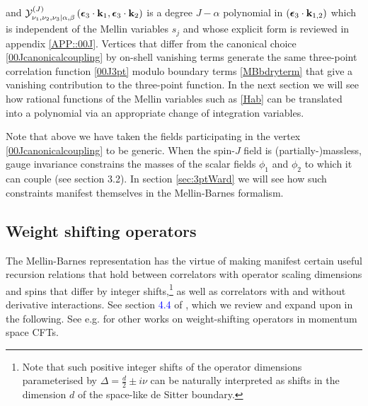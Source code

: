 \documentclass[11pt,a4paper]{article}
\newcommand{\tcb}{\textcolor{blue}}
\begin{document}
and ${\cal Y}^{\left(J\right)}_{\nu_1,\nu_2,\nu_3|\alpha,\beta}\left(\boldsymbol{\epsilon}_3 \cdot {\bf k}_1,\boldsymbol{\epsilon}_3 \cdot {\bf k}_2\right)$ is a degree $J-\alpha$ polynomial in $\left(\boldsymbol{\epsilon}_3 \cdot {\bf k}_{1,2}\right)$ which is independent of the Mellin variables $s_j$ and whose explicit form is reviewed in appendix \ref{APP::00J}. Vertices that differ from the canonical choice \eqref{00Jcanonicalcoupling} by on-shell vanishing terms generate the same three-point correlation function \eqref{00J3pt} modulo boundary terms \eqref{MBbdryterm} that give a vanishing contribution to the three-point function.
In the next section we will see how rational functions of the Mellin variables such as \eqref{Hab} can be translated into a polynomial via an appropriate change of integration variables.

Note that above we have taken the fields participating in the vertex \eqref{00Jcanonicalcoupling} to be generic. When the spin-$J$ field is (partially-)massless, gauge invariance constrains the masses of the scalar fields $\phi_1$ and $\phi_2$ to which it can couple (see \cite{Joung:2012rv} section 3.2). In section \ref{sec:3ptWard} we will see how such constraints manifest themselves in the Mellin-Barnes formalism.



\subsection{Weight shifting operators}
\label{subsec::WSop}

The Mellin-Barnes representation has the virtue of making manifest certain useful recursion relations that hold between correlators with operator scaling dimensions and spins that differ by integer shifts,\footnote{Note that such positive integer shifts of the operator dimensions parameterised by $\Delta=\frac{d}{2}\pm i\nu$ can be naturally interpreted as shifts in the dimension $d$ of the space-like de Sitter boundary.} as well as correlators with and without derivative interactions. See section \tcb{4.4} of \cite{Sleight:2019hfp}, which we review and expand upon in the following. See e.g. \cite{Isono:2018rrb,Arkani-Hamed:2018kmz,Isono:2019ihz,Baumann:2019oyu,Isono:2019wex,Baumann:2020dch} for other works on weight-shifting operators in momentum space CFTs. 
\end{document}
